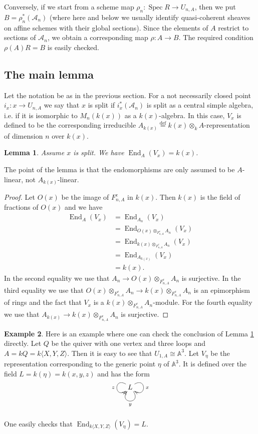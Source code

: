 \documentclass{amsart}
\numberwithin{equation}{section}
\let\cal\mathcal
\let\blb\mathbb
\newtheorem{lemmas}{Lemma}[subsection]
\theoremstyle{definition}
\newtheorem{examples}[lemmas]{Example}
\theoremstyle{remark}
\begin{document}
Conversely, if we start from a scheme map $\rho_n:{\operatorname {Spec}} R{\rightarrow} U_{n,A}$, then we put
$B=\rho_n^\ast({{\cal A}}_n)$ (where here and below we usually identify quasi-coherent sheaves on affine schemes with 
their global sections).  Since the elements of $A$ restrict to sections
of ${{\cal A}}_n$, we obtain a corresponding map $\rho:A{\rightarrow} B$. The required condition
$\rho(A)R=B$ is easily checked.

\subsection{The main lemma}
Let the notation be as in the previous section. 
For a not necessarily closed point $i_x:x{\rightarrow} U_{n,A}$  
we say that $x$ is split 
if $i^\ast_x({{\cal A}}_{n})$ is split as a central simple algebra, i.e. if it  is isomorphic to $M_n(k(x))$ as a $k(x)$-algebra.
In this case, $V_x$ is defined to be the corresponding irreducible $A_{k(x)}\overset{\text{def}}{=}k(x)\otimes_k A$-representation
of dimension $n$ over $k(x)$.
\begin{lemmas} \label{ref-2.2.1-3} Assume $x$ is split. We have
$
{\operatorname {End}}_A(V_x)=k(x)
$.
\end{lemmas}
The point of the lemma is that the endomorphisms are only assumed to be $A$-linear, not $A_{k(x)}$-linear.
\begin{proof} Let $O(x)$ be the image of $F^e_{n,A}$ in $k(x)$. Then $k(x)$ is the field
of fractions of $O(x)$ and we have 
\begin{align*}
{\operatorname {End}}_A(V_x)&={\operatorname {End}}_{{A}_n}(V_x)\\
&={\operatorname {End}}_{O(x)\otimes_{F^e_{n,A}}{A}_n}(V_x)\\
&={\operatorname {End}}_{k(x)\otimes_{F^e_{n,A}}{A}_n}(V_x)\\
&={\operatorname {End}}_{A_{k(x)}}(V_x)\\
&=k(x).
\end{align*}
In the second equality we use that ${A}_n{\rightarrow} O(x)\otimes_{F^e_{n,A}}{A}_n$ is surjective.
In the third equality we use that $O(x)\otimes_{F^e_{n,A}}{A}_n{\rightarrow} k(x)\otimes_{F^e_{n,A}}{A}_n$
is an epimorphism of rings and the fact that $V_x$ is a $k(x)\otimes_{F^e_{n,A}}{A}_n$-module. For the
fourth equality we use that $A_{k(x)}{\rightarrow} k(x)\otimes_{F^e_{n,A}}{A}_n$ is surjective.
\end{proof}
\begin{examples} \label{ref-2.2.2-4} Here is an example where one can check the conclusion of Lemma \ref{ref-2.2.1-3} directly.
Let $Q$ be the quiver with one vertex and three loops and $A=kQ=k\langle X,Y,Z\rangle$. Then it is easy to see
that $U_{1,A}\cong {{\blb A}}^3$. 
Let $V_\eta$ be the representation corresponding to the generic point $\eta$ of ${{\blb A}}^3$. It is 
defined over the field $L=k(\eta)=k(x,y,z)$ and has the form 
\[
\xymatrix{
&L \ar@(ur,dr)^x\ar@(dr,dl)^y\ar@(ul,dl)_z&\\
&&
}
\]
One easily checks that ${\operatorname {End}}_{k\langle X,Y,Z\rangle}(V_\eta)=L$.
\end{examples}
\end{document}
